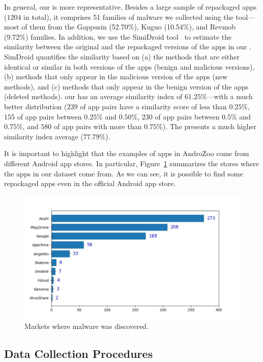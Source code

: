In general, our \cds is more representative. Besides a large sample of repackaged apps ($1204$ in total), it
comprises 51 families of malware we collected using the \avt tool---most
of them from the Gappusin (52.70\%), Kuguo (10.54\%), and Revmob (9.72\%) families.  
In addition, we use the SimiDroid tool~\cite{DBLP:conf/trustcom/0029BK17} to
estimate the similarity between the original and the repackaged versions of the
apps in our \cds. SimDroid quantifies the similarity
based on (a) the methods that are either identical or similar in both versions of the apps (benign and malicious versions),
(b) methods that only appear in the malicious version of the apps (new methods), and (c) methods that only appear in the
benign version of the apps (deleted methods).
our \cds has an average similarity index of $61.25\%$---with a much better distribution ($239$ of
app pairs have a similarity score of less than $0.25\%$, $155$ of app pairs
between $0.25\%$ and $0.50\%$, $230$ of app pairs between $0.5\%$ and $0.75\%$,
and $580$ of app pairs with more than $0.75\%$). The \sds presents a much higher
similarity index average (77.79\%). 

It is important to highlight that the examples of apps in AndroZoo
come from different Android app stores. In particular,
Figure~\ref{fig:stores} summarizes the stores where the apps in our dataset come
from. As we can see, it is
possible to find some repackaged apps
even in the official Android app store.


\begin{figure}[ht]
\centering
\includegraphics[scale=0.43]{images/stores.pdf}
\caption{Markets where malware was discovered.}
 \label{fig:stores}
\end{figure}


\subsection{Data Collection Procedures} \label{sec:dataCollectionProc}


